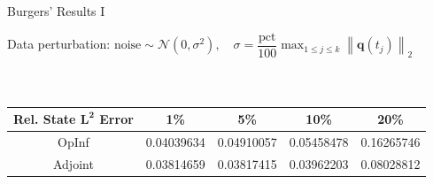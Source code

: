 \begin{frame}{Burgers' Results I}

Data perturbation: $\displaystyle\text{noise}\sim\mathcal{N}(0, \sigma^2),\quad \sigma=\dfrac{\text{pct}}{100}\max_{1 \leq j \leq k} \left\| \mathbf{q}(t_j) \right\|_2
$

\vspace{0.6cm}

  \begin{columns}[T,onlytextwidth]  %
      \centering
      \label{fig:left}


      \centering
      \label{fig:right}
  \end{columns}

\vspace{-0.3cm}

  \begin{table}[]
        \begin{tabular}{c|cccc}
            \textbf{Rel. State $\mathbf{L^2}$ Error} & 1\% & 5\% & 10\% & 20\% \\
            \hline\hline
            OpInf     &  0.04039634  & 0.04910057   & 0.05458478  & 0.16265746  \\
            Adjoint   &  0.03814659  & 0.03817415   & 0.03962203  & 0.08028812 
        \end{tabular}
  \end{table}
    
\end{frame}

